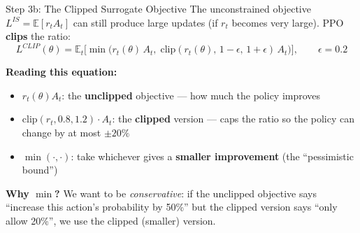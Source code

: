 \documentclass[aspectratio=169,11pt]{beamer}
\begin{document}
\begin{frame}{Step 3b: The Clipped Surrogate Objective}
  \small
  The unconstrained objective $L^{IS} = \mathbb{E}[r_t A_t]$ can still produce large updates
  (if $r_t$ becomes very large).  PPO \textbf{clips} the ratio:
  \[
    L^{CLIP}(\theta) = \mathbb{E}_t\!\Big[
      \min\!\big( r_t(\theta)\, A_t,\;
      \mathrm{clip}(r_t(\theta),\, 1{-}\epsilon,\, 1{+}\epsilon)\, A_t \big)
    \Big],
    \qquad \epsilon = 0.2
  \]

  \textbf{Reading this equation:}
  \begin{itemize}\setlength\itemsep{3pt}
    \item $r_t(\theta) A_t$: the \textbf{unclipped} objective --- how much the policy improves
    \item $\mathrm{clip}(r_t, 0.8, 1.2) \cdot A_t$: the \textbf{clipped} version ---
      caps the ratio so the policy can change by at most $\pm 20\%$
    \item $\min(\cdot, \cdot)$: take whichever gives a \textbf{smaller improvement}
      (the ``pessimistic bound'')
  \end{itemize}

  \medskip
  \textbf{Why $\min$?}  We want to be \emph{conservative}: if the unclipped objective
  says ``increase this action's probability by 50\%'' but the clipped version says
  ``only allow 20\%'', we use the clipped (smaller) version.
\end{frame}
\end{document}
